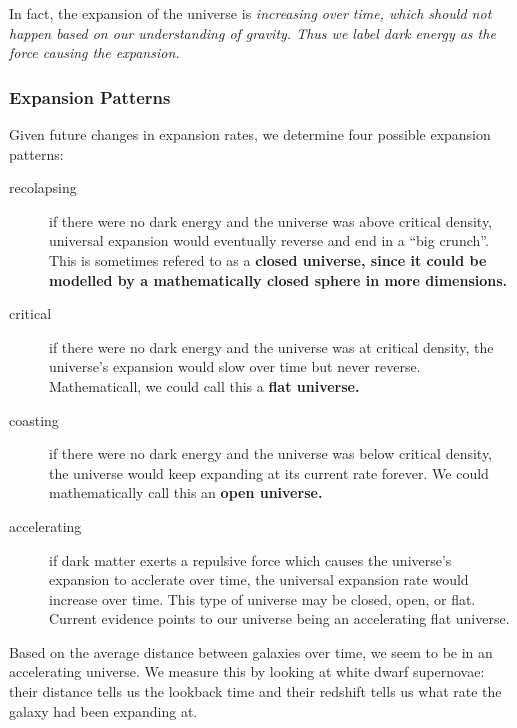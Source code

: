 In fact, the expansion of the universe is \it{increasing} over time, which should not happen based on our understanding of gravity. Thus we label dark energy as the force causing the expansion.

\subsubsection{Expansion Patterns}
Given future changes in expansion rates, we determine four possible expansion patterns:
\begin{description}
\item[recolapsing] if there were no dark energy and the universe was above critical density, universal expansion would eventually reverse and end in a ``big crunch''. This is sometimes refered to as a \bf{closed universe}, since it could be modelled by a mathematically closed sphere in more dimensions.
\item[critical] if there were no dark energy and the universe was at critical density, the universe's expansion would slow over time but never reverse. Mathematicall, we could call this a \bf{flat universe}.
\item[coasting] if there were no dark energy and the universe was below critical density, the universe would keep expanding at its current rate forever. We could mathematically call this an \bf{open universe}.
\item[accelerating] if dark matter exerts a repulsive force which causes the universe's expansion to acclerate over time, the universal expansion rate would increase over time. This type of universe may be closed, open, or flat. Current evidence points to our universe being an accelerating flat universe.
\end{description}

Based on the average distance between galaxies over time, we seem to be in an accelerating universe. We measure this by looking at white dwarf supernovae: their distance tells us the lookback time and their redshift tells us what rate the galaxy had been expanding at.
